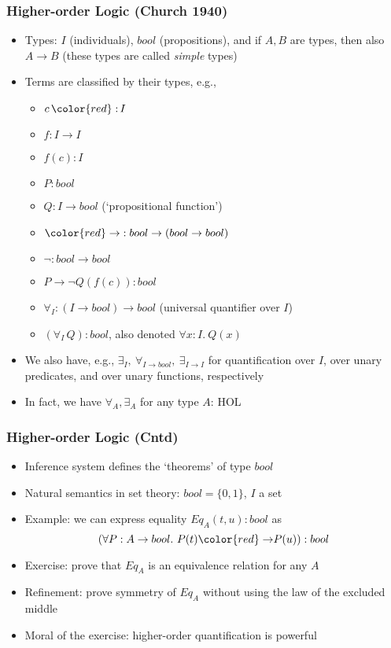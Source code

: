 \documentclass[handout]{beamer}
\newcommand{\set}[1]{\{#1\}}
\begin{document}
\frame
  {
  
    \frametitle{Higher-order Logic (Church 1940)}

    \begin{itemize}[<+->]
          \item Types: $I$ (individuals), $bool$ (propositions), and if $A,B$ are
          types, then also $A\to B$ (these types are called \emph{simple} types)
          \item Terms are classified by their types, e.g.,  
            \begin{itemize}[<+->]
            \item $c\,{\color{red}:}\,I$
            \item $f:I\to I$
            \item $f(c) : I$
            \item $P: bool$
            \item $Q:I\to bool$ (`propositional function')
            \item ${\color{red}\to}:bool\to (bool\to bool)$
            \item ${\neg}: bool\to bool $
            \item $P \to \neg Q(f(c)) : bool$
            \item $\forall_I :(I\to bool)\to bool$ (universal quantifier over $I$)
            \item $(\forall_I\,Q):bool$, also denoted $\forall x{:}I.~Q(x)$
            \end{itemize}
          \item We also have, e.g., $\exists_{I},~\forall_{I\to bool},~\exists_{I\to I}$ for quantification
          over $I$, over unary predicates, and over unary functions, respectively
          \item In fact, we have $\forall_A,\exists_A$ for any type $A$: {\color{red}HO}L
    \end{itemize}
  }

\frame
  {
  
    \frametitle{Higher-order Logic (Cntd)}

    \begin{itemize}[<+->]
         \item Inference system defines the `theorems' of type $bool$
        \item Natural semantics in set theory: $bool=\set{0,1}$, $I$ a set      
        \item Example: we can express equality $Eq_A(t,u): bool$ as 
          \[(\forall P:A\to bool.~P(t){\color{red}\to} P(u)) : bool\]
        \item Exercise: prove that $Eq_A$ is an equivalence relation for any $A$
        \item Refinement: prove symmetry of $Eq_A$ without using the law of the excluded middle
        \item Moral of the exercise: higher-order quantification is powerful
    \end{itemize}

  }
\end{document}
